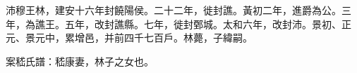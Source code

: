 
\begin{pinyinscope}
沛穆王林，建安十六年封饒陽侯。二十二年，徙封譙。黃初二年，進爵為公。三年，為譙王。五年，改封譙縣。七年，徙封鄄城。太和六年，改封沛。景初、正元、景元中，累增邑，并前四千七百戶。林薨，子緯嗣。

案嵇氏譜：嵇康妻，林子之女也。


\end{pinyinscope}